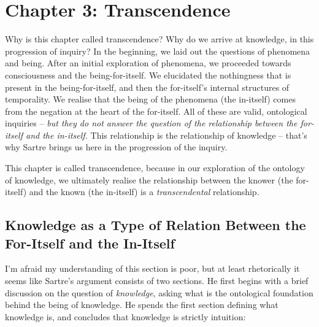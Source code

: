 \section{Chapter 3: Transcendence}

Why is this chapter called transcendence? Why do we arrive at knowledge, in this progression of inquiry? In the beginning, we laid out the questions of phenomena and being. After an initial exploration of phenomena, we proceeded towards consciousness and the being-for-itself. We elucidated the nothingness that is present in the being-for-itself, and then the for-itself's internal structures of temporality. We realise that the being of the phenomena (the in-itself) comes from the negation at the heart of the for-itself. All of these are valid, ontological inquiries -- \emph{but they do not answer the question of the relationship between the for-itself and the in-itself.} This relationship is the relationship of knowledge -- that's why Sartre brings us here in the progression of the inquiry.

\noindent
This chapter is called transcendence, because in our exploration of the ontology of knowledge, we ultimately realise the relationship between the knower (the for-itself) and the known (the in-itself) is a \emph{transcendental} relationship.

\subsection{Knowledge as a Type of Relation Between the For-Itself and the In-Itself}

I'm afraid my understanding of this section is poor, but at least rhetorically it seems like Sartre's argument consists of two sections. He first begins with a brief discussion on the question of \emph{knowledge}, asking what is the ontological foundation behind the being of knowledge. He spends the first section defining what knowledge is, and concludes that knowledge is strictly intuition:

